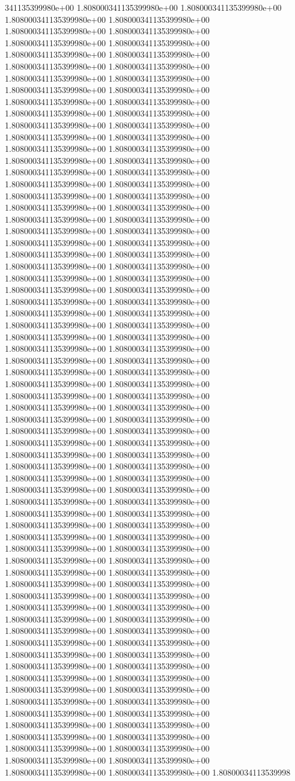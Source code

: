 341135399980e+00	1.808000341135399980e+00	1.808000341135399980e+00	1.808000341135399980e+00	1.808000341135399980e+00	1.808000341135399980e+00	1.808000341135399980e+00	1.808000341135399980e+00	1.808000341135399980e+00	1.808000341135399980e+00	1.808000341135399980e+00	1.808000341135399980e+00	1.808000341135399980e+00	1.808000341135399980e+00	1.808000341135399980e+00	1.808000341135399980e+00	1.808000341135399980e+00	1.808000341135399980e+00	1.808000341135399980e+00	1.808000341135399980e+00	1.808000341135399980e+00	1.808000341135399980e+00	1.808000341135399980e+00	1.808000341135399980e+00	1.808000341135399980e+00	1.808000341135399980e+00	1.808000341135399980e+00	1.808000341135399980e+00	1.808000341135399980e+00	1.808000341135399980e+00	1.808000341135399980e+00	1.808000341135399980e+00	1.808000341135399980e+00	1.808000341135399980e+00	1.808000341135399980e+00	1.808000341135399980e+00	1.808000341135399980e+00	1.808000341135399980e+00	1.808000341135399980e+00	1.808000341135399980e+00	1.808000341135399980e+00	1.808000341135399980e+00	1.808000341135399980e+00	1.808000341135399980e+00	1.808000341135399980e+00	1.808000341135399980e+00	1.808000341135399980e+00	1.808000341135399980e+00	1.808000341135399980e+00	1.808000341135399980e+00	1.808000341135399980e+00	1.808000341135399980e+00	1.808000341135399980e+00	1.808000341135399980e+00	1.808000341135399980e+00	1.808000341135399980e+00	1.808000341135399980e+00	1.808000341135399980e+00	1.808000341135399980e+00	1.808000341135399980e+00	1.808000341135399980e+00	1.808000341135399980e+00	1.808000341135399980e+00	1.808000341135399980e+00	1.808000341135399980e+00	1.808000341135399980e+00	1.808000341135399980e+00	1.808000341135399980e+00	1.808000341135399980e+00	1.808000341135399980e+00	1.808000341135399980e+00	1.808000341135399980e+00	1.808000341135399980e+00	1.808000341135399980e+00	1.808000341135399980e+00	1.808000341135399980e+00	1.808000341135399980e+00	1.808000341135399980e+00	1.808000341135399980e+00	1.808000341135399980e+00	1.808000341135399980e+00	1.808000341135399980e+00	1.808000341135399980e+00	1.808000341135399980e+00	1.808000341135399980e+00	1.808000341135399980e+00	1.808000341135399980e+00	1.808000341135399980e+00	1.808000341135399980e+00	1.808000341135399980e+00	1.808000341135399980e+00	1.808000341135399980e+00	1.808000341135399980e+00	1.808000341135399980e+00	1.808000341135399980e+00	1.808000341135399980e+00	1.808000341135399980e+00	1.808000341135399980e+00	1.808000341135399980e+00	1.808000341135399980e+00	1.808000341135399980e+00	1.808000341135399980e+00	1.808000341135399980e+00	1.808000341135399980e+00	1.808000341135399980e+00	1.808000341135399980e+00	1.808000341135399980e+00	1.808000341135399980e+00	1.808000341135399980e+00	1.808000341135399980e+00	1.808000341135399980e+00	1.808000341135399980e+00	1.808000341135399980e+00	1.808000341135399980e+00	1.808000341135399980e+00	1.808000341135399980e+00	1.808000341135399980e+00	1.808000341135399980e+00	1.808000341135399980e+00	1.808000341135399980e+00	1.808000341135399980e+00	1.808000341135399980e+00	1.808000341135399980e+00	1.808000341135399980e+00	1.808000341135399980e+00	1.808000341135399980e+00	1.808000341135399980e+00	1.808000341135399980e+00	1.808000341135399980e+00	1.808000341135399980e+00	1.808000341135399980e+00	1.808000341135399980e+00	1.808000341135399980e+00	1.80800034113539998